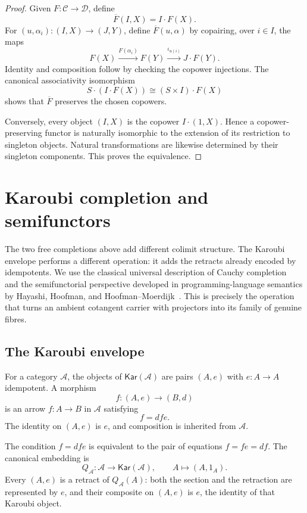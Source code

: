 \documentclass[runningheads,envcountsame]{llncs}
\newcommand{\Kar}{\mathsf{Kar}}
\begin{document}
\begin{proof}
Given $F:\mathcal C\to\mathcal D$, define
$$
\overline F(I,X)=I\cdot F(X).
$$
For $(u,\alpha_i):(I,X)\to(J,Y)$, define $\overline F(u,\alpha)$ by copairing, over $i\in I$, the maps
$$
F(X)
\xrightarrow{F(\alpha_i)}
F(Y)
\xrightarrow{\iota_{u(i)}}
J\cdot F(Y).
$$
Identity and composition follow by checking the copower injections. The canonical associativity isomorphism
$$
S\cdot(I\cdot F(X))
\cong
(S\times I)\cdot F(X)
$$
shows that $\overline F$ preserves the chosen copowers.

Conversely, every object $(I,X)$ is the copower $I\cdot(1,X)$. Hence a copower-preserving functor is naturally isomorphic to the extension of its restriction to singleton objects. Natural transformations are likewise determined by their singleton components. This proves the equivalence.
\end{proof}

\section{Karoubi completion and semifunctors}
\label{app:kar-semi}

The two free completions above add different colimit structure. The Karoubi envelope performs a different operation: it adds the retracts already encoded by idempotents. We use the classical universal description of Cauchy completion~\cite{Kelly1982,BorceuxDejean1986,MacLane1998} and the semifunctorial perspective developed in programming-language semantics by Hayashi, Hoofman, and Hoofman--Moerdijk~\cite{Hayashi1985,Hoofman1993,HoofmanMoerdijk1995}. This is precisely the operation that turns an ambient cotangent carrier with projectors into its family of genuine fibres.

\subsection{The Karoubi envelope}

\begin{definition}
\label{def:kar-app}
For a category $\mathcal A$, the objects of $\Kar(\mathcal A)$ are pairs $(A,e)$ with $e:A\to A$ idempotent. A morphism
$$
f:(A,e)\longrightarrow(B,d)
$$
is an arrow $f:A\to B$ in $\mathcal A$ satisfying
$$
f=dfe.
$$
The identity on $(A,e)$ is $e$, and composition is inherited from $\mathcal A$.
\end{definition}

The condition $f=dfe$ is equivalent to the pair of equations $f=fe=df$. The canonical embedding is
$$
Q_\mathcal A:\mathcal A\longrightarrow\Kar(\mathcal A),
\qquad
A\longmapsto(A,1_A).
$$
Every $(A,e)$ is a retract of $Q_\mathcal A(A)$: both the section and the retraction are represented by $e$, and their composite on $(A,e)$ is $e$, the identity of that Karoubi object.
\end{document}
